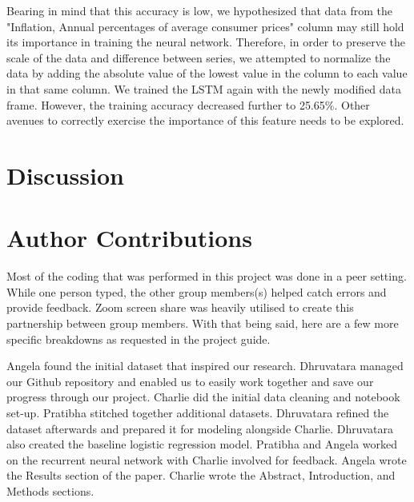 \documentclass[12pt]{article}
\begin{document}
Bearing in mind that this accuracy is low, we hypothesized that data from the "Inflation, Annual percentages of average consumer prices" column may still hold its importance in training the neural network. Therefore, in order to preserve the scale of the data and difference between series, we attempted to normalize the data by adding the absolute value of the lowest value in the column to each value in that same column. We trained the LSTM again with the newly modified data frame. However, the training accuracy decreased further to 25.65\%. Other avenues to correctly exercise the importance of this feature needs to be explored. 

\section{Discussion}

\section{Author Contributions}
Most of the coding that was performed in this project was done in a peer setting. While one person typed, the other group members(s) helped catch errors and provide feedback. Zoom screen share was heavily utilised to create this partnership between group members. With that being said, here are a few more specific breakdowns as requested in the project guide. 

Angela found the initial dataset that inspired our research. Dhruvatara managed our Github repository and enabled us to easily work together and save our progress through our project. Charlie did the initial data cleaning and notebook set-up. Pratibha stitched together additional datasets. Dhruvatara refined the dataset afterwards and prepared it for modeling alongside Charlie. Dhruvatara also created the baseline logistic regression model. Pratibha and Angela worked on the recurrent neural network with Charlie involved for feedback. Angela wrote the Results section of the paper. Charlie wrote the Abstract, Introduction, and Methods sections.



\printbibliography
\end{document}

